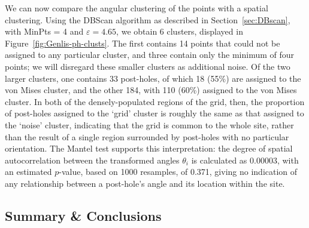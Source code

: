 \documentclass[../../ArchStats.tex]{subfiles}
\begin{document}
We can now compare the angular clustering of the points with a spatial clustering. Using the DBScan algorithm as described in Section~\ref{sec:DBscan}, with MinPts = 4 and $\varepsilon = 4.65$, we obtain 6 clusters, displayed in Figure~\ref{fig:Genlis-ph-clusts}. The first contains 14 points that could not be assigned to any particular cluster, and three contain only the minimum of four points; we will disregard these smaller clusters as additional noise. Of the two larger clusters, one contains 33 post-holes, of which 18 (55\%) are assigned to the von Mises cluster, and the other 184, with 110 (60\%) assigned to the von Mises cluster. In both of the densely-populated regions of the grid, then, the proportion of post-holes assigned to the `grid' cluster is roughly the same as that assigned to the `noise' cluster, indicating that the grid is common to the whole site, rather than the result of a single region surrounded by post-holes with no particular orientation. The Mantel test supports this interpretation:  the degree of spatial autocorrelation between the transformed angles $\theta_i$ is calculated as 0.00003, with an estimated $p$-value, based on 1000 resamples, of 0.371, giving no indication of any relationship between a post-hole's angle and its location within the site.




\subsection{Summary \& Conclusions}

\end{document}
